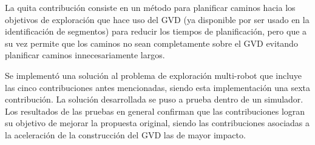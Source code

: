 La quita contribución consiste en un método para planificar caminos hacia
los objetivos de exploración que hace uso del GVD (ya disponible por ser usado
en la identificación de segmentos) para reducir los tiempos de planificación,
pero que a su vez permite que los caminos no sean completamente sobre el GVD evitando
planificar caminos innecesariamente largos.

Se implementó una solución al problema de exploración multi-robot que incluye
las cinco contribuciones antes mencionadas, siendo esta implementación una sexta
contribución. La solución desarrollada se puso a prueba dentro de un simulador. Los
resultados de las pruebas en general confirman que las contribuciones logran su
objetivo de mejorar la propuesta original, siendo las contribuciones asociadas
a la aceleración de la construcción del GVD las de mayor impacto.

